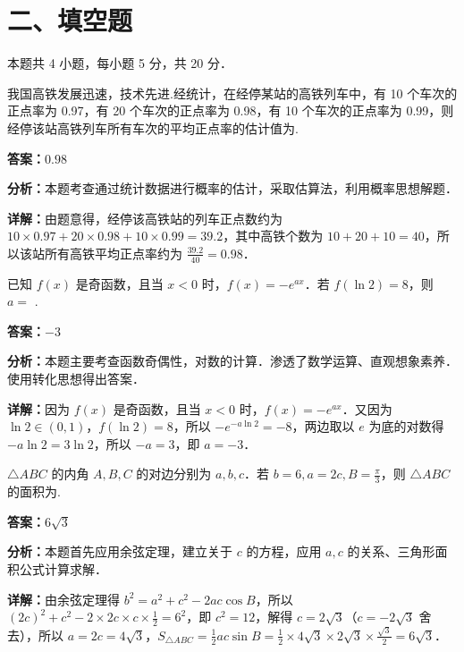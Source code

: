 \section*{二、填空题}
本题共 4 小题，每小题 5 分，共 20 分．

\begin{question}[points=5]
我国高铁发展迅速，技术先进.经统计，在经停某站的高铁列车中，有 10 个车次的正点率为 0.97，有 20 个车次的正点率为 0.98，有 10 个车次的正点率为 0.99，则经停该站高铁列车所有车次的平均正点率的估计值为.
\fillin[{$0.98$}]
\begin{solution}
\textbf{答案：}$0.98$

\textbf{分析：}本题考查通过统计数据进行概率的估计，采取估算法，利用概率思想解题．

\textbf{详解：}由题意得，经停该高铁站的列车正点数约为 $10\times0.97+20\times0.98+10\times0.99=39.2$，其中高铁个数为 $10+20+10=40$，所以该站所有高铁平均正点率约为 $\frac{39.2}{40}=0.98$．
\end{solution}
\end{question}

\begin{question}[points=5]
已知 $f(x)$ 是奇函数，且当 $x<0$ 时，$f(x)=-e^{ax}$．若 $f(\ln 2)=8$，则 $a=$ .
\fillin[{$-3$}]
\begin{solution}
\textbf{答案：}$-3$

\textbf{分析：}本题主要考查函数奇偶性，对数的计算．渗透了数学运算、直观想象素养．使用转化思想得出答案．

\textbf{详解：}因为 $f(x)$ 是奇函数，且当 $x<0$ 时，$f(x)=-e^{ax}$．又因为 $\ln 2\in(0,1)$，$f(\ln 2)=8$，所以 $-e^{-a\ln 2}=-8$，两边取以 $e$ 为底的对数得 $-a\ln 2=3\ln 2$，所以 $-a=3$，即 $a=-3$．
\end{solution}
\end{question}

\begin{question}[points=5]
$\triangle ABC$ 的内角 $A,B,C$ 的对边分别为 $a,b,c$．若 $b=6,a=2c,B=\frac{\pi}{3}$，则 $\triangle ABC$ 的面积为.
\fillin[{$6\sqrt{3}$}]
\begin{solution}
\textbf{答案：}$6\sqrt{3}$

\textbf{分析：}本题首先应用余弦定理，建立关于 $c$ 的方程，应用 $a,c$ 的关系、三角形面积公式计算求解．

\textbf{详解：}由余弦定理得 $b^2=a^2+c^2-2ac\cos B$，所以 $(2c)^2+c^2-2\times 2c\times c\times\frac{1}{2}=6^2$，即 $c^2=12$，解得 $c=2\sqrt{3}$（$c=-2\sqrt{3}$ 舍去），所以 $a=2c=4\sqrt{3}$，$S_{\triangle ABC}=\frac{1}{2}ac\sin B=\frac{1}{2}\times 4\sqrt{3}\times 2\sqrt{3}\times\frac{\sqrt{3}}{2}=6\sqrt{3}$．
\end{solution}
\end{question}

